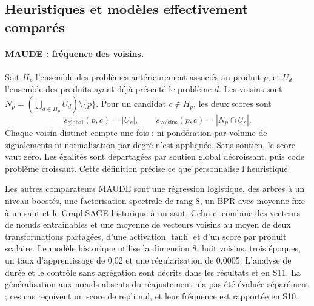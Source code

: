 \subsection{Heuristiques et modèles effectivement comparés}
\label{sec:models}

\paragraph{MAUDE : fréquence des voisins.} Soit $H_p$ l'ensemble des problèmes antérieurement associés au produit $p$, et $U_d$ l'ensemble des produits ayant déjà présenté le problème $d$. Les voisins sont $N_p=(\bigcup_{d\in H_p} U_d)\setminus\{p\}$. Pour un candidat $c\notin H_p$, les deux scores sont
\begin{equation}
 s_{\mathrm{global}}(p,c)=|U_c|,\qquad
 s_{\mathrm{voisins}}(p,c)=|N_p\cap U_c|.
\end{equation}
Chaque voisin distinct compte une fois : ni pondération par volume de signalements ni normalisation par degré n'est appliquée. Sans soutien, le score vaut zéro. Les égalités sont départagées par soutien global décroissant, puis code problème croissant\cite{hgbcode}. Cette définition précise ce que personnalise l'heuristique.

Les autres comparateurs MAUDE sont une régression logistique, des arbres à un niveau boostés, une factorisation spectrale de rang 8, un BPR avec moyenne fixe à un saut et le GraphSAGE historique à un saut\cite{hamilton2017,rendle2009,hgbcode}. Celui-ci combine des vecteurs de nœuds entraînables et une moyenne de vecteurs voisins au moyen de deux transformations partagées, d'une activation $\tanh$ et d'un score par produit scalaire. Le modèle historique utilise la dimension 8, huit voisins, trois époques, un taux d'apprentissage de 0,02 et une régularisation de 0,0005. L'analyse de durée et le contrôle sans agrégation sont décrits dans les résultats et en S11. La généralisation aux nœuds absents du réajustement n'a pas été évaluée séparément ; ces cas reçoivent un score de repli nul, et leur fréquence est rapportée en S10.


